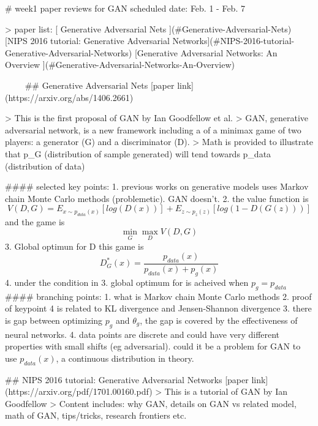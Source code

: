 
# week1 paper reviews for GAN
scheduled date: Feb. 1 - Feb. 7    

> paper list:  
[ Generative Adversarial Nets ](#Generative-Adversarial-Nets)  
[NIPS 2016 tutorial: Generative Adversarial Networks](#NIPS-2016-tutorial-Generative-Adversarial-Networks)  
[Generative Adversarial Networks: An Overview ](#Generative-Adversarial-Networks-An-Overview)  


$\qquad$ 
## Generative Adversarial Nets     
[paper link](https://arxiv.org/abs/1406.2661)

> This is the first proposal of GAN by Ian Goodfellow et al. 
> GAN, generative adversarial network, is a new framework including a of a minimax game of two players: a generator (G) and a discriminator (D). 
> Math is provided to illustrate that p_G (distribution of sample generated) will tend towards p_data (distribution of data)

#### selected key points:
1. previous works on generative models uses Markov chain Monte Carlo methods (problemetic). GAN doesn't.
2. the value function is $$V(D,G) = E_{x\sim p_{data}(x)}[log(D(x))]+E_{z\sim p_{z}(z)}[log(1-D(G(z)))]$$ and the game is $$\min\limits_{G}\max\limits_{D}V(D,G)$$
3. Global optimun for D this game is $$ D^*_G(x) = \dfrac{p_{data}(x)}{p_{data}(x)+p_g(x)}$$ 
4. under the condition in 3. global optimum for is acheived when $p_g = p_{data}$
#### branching points:
1. what is Markov chain Monte Carlo methods 
2. proof of keypoint 4 is related to KL divergence and Jensen-Shannon divergence
3. there is gap between optimizing $p_g$ and $\theta_g$, the gap is covered by the effectiveness of neural networks.
4. data points are discrete and could have very different properties with small shifts (eg adversarial). could it be a problem for GAN to use $p_{data}(x)$, a continuous distribution in theory.

## NIPS 2016 tutorial: Generative Adversarial Networks 
[paper link](https://arxiv.org/pdf/1701.00160.pdf)
> This is a tutorial of GAN by Ian Goodfellow
> Content includes: why GAN, details on GAN vs related model, math of GAN, tips/tricks, research frontiers etc.

